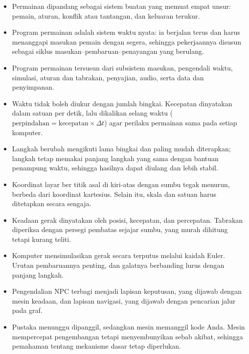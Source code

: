 
\begin{rangkumanbox}
\begin{itemize}
  \item Permainan dipandang sebagai sistem buatan yang memuat empat unsur:
        pemain, aturan, konflik atau tantangan, dan keluaran terukur.
  \item Program permainan adalah sistem waktu nyata: ia berjalan terus dan
        harus menanggapi masukan pemain dengan segera, sehingga pekerjaannya
        disusun sebagai siklus masukan--pembaruan--penayangan yang berulang.
  \item Program permainan tersusun dari subsistem masukan, pengendali waktu,
        simulasi, aturan dan tabrakan, penyajian, audio, serta data dan
        penyimpanan.
  \item Waktu tidak boleh diukur dengan jumlah bingkai. Kecepatan dinyatakan
        dalam satuan per detik, lalu dikalikan selang waktu
        ($\text{perpindahan} = \text{kecepatan} \times \Delta t$) agar perilaku
        permainan sama pada setiap komputer.
  \item Langkah berubah mengikuti lama bingkai dan paling mudah diterapkan;
        langkah tetap memakai panjang langkah yang sama dengan bantuan
        penampung waktu, sehingga hasilnya dapat diulang dan lebih stabil.
  \item Koordinat layar ber titik asal di kiri-atas dengan sumbu tegak menurun,
        berbeda dari koordinat kartesius. Selain itu, skala dan satuan harus
        ditetapkan secara sengaja.
  \item Keadaan gerak dinyatakan oleh posisi, kecepatan, dan percepatan.
        Tabrakan diperiksa dengan persegi pembatas sejajar sumbu, yang murah
        dihitung tetapi kurang teliti.
  \item Komputer mensimulasikan gerak secara terputus melalui kaidah Euler.
        Urutan pembaruannya penting, dan galatnya berbanding lurus dengan
        panjang langkah.
  \item Pengendalian NPC terbagi menjadi lapisan keputusan, yang dijawab
        dengan mesin keadaan, dan lapisan navigasi, yang dijawab dengan
        pencarian jalur pada graf.
  \item Pustaka menunggu dipanggil, sedangkan mesin memanggil kode Anda.
        Mesin mempercepat pengembangan tetapi menyembunyikan sebab akibat,
        sehingga pemahaman tentang mekanisme dasar tetap diperlukan.
\end{itemize}
\end{rangkumanbox}
